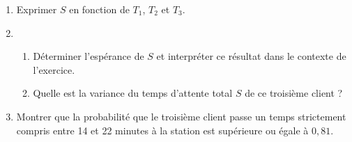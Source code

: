\begin{enumerate}
	\item Exprimer $S$ en fonction de $T_1$, $T_2$ et $T_3$.
	\item 
	\begin{enumerate}
		\item Déterminer l'espérance de $S$ et interpréter ce résultat dans le contexte de l'exercice.
		\item Quelle est la variance du temps d'attente total $S$ de ce troisième client ?
	\end{enumerate}
	\item Montrer que la probabilité que le troisième client passe un temps strictement compris entre 14 et 22 minutes à la station est supérieure ou égale à $0,81$.
\end{enumerate}